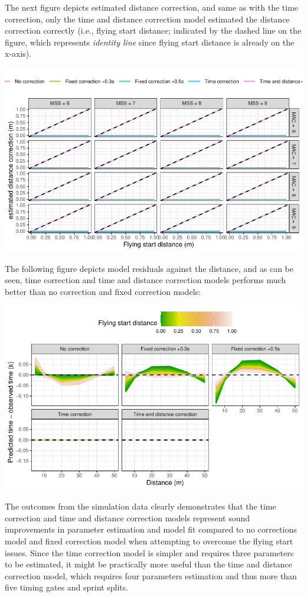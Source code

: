 \documentclass[fleqn,10pt,lineno]{wlpeerj} %
\begin{document}
The next figure depicts estimated distance correction, and same as with the time correction, only the time and distance correction model estimated the distance correction correctly (i.e., flying start distance; indicated by the dashed line on the figure, which represents \emph{identity line} since flying start distance is already on the x-axis).

\begin{center}\includegraphics[width=0.9\linewidth]{paper_files/figure-latex/unnamed-chunk-41-1} \end{center}

The following figure depicts model residuals against the distance, and as can be seen, time correction and time and distance correction models performs much better than no correction and fixed correction models:

\begin{center}\includegraphics[width=0.9\linewidth]{paper_files/figure-latex/unnamed-chunk-42-1} \end{center}

The outcomes from the simulation data clearly demonstrates that the time correction and time and distance correction models represent sound improvements in parameter estimation and model fit compared to no corrections model and fixed correction model when attempting to overcome the flying start issues. Since the time correction model is simpler and requires three parameters to be estimated, it might be practically more useful than the time and distance correction model, which requires four parameters estimation and thus more than five timing gates and sprint splits.
\end{document}
